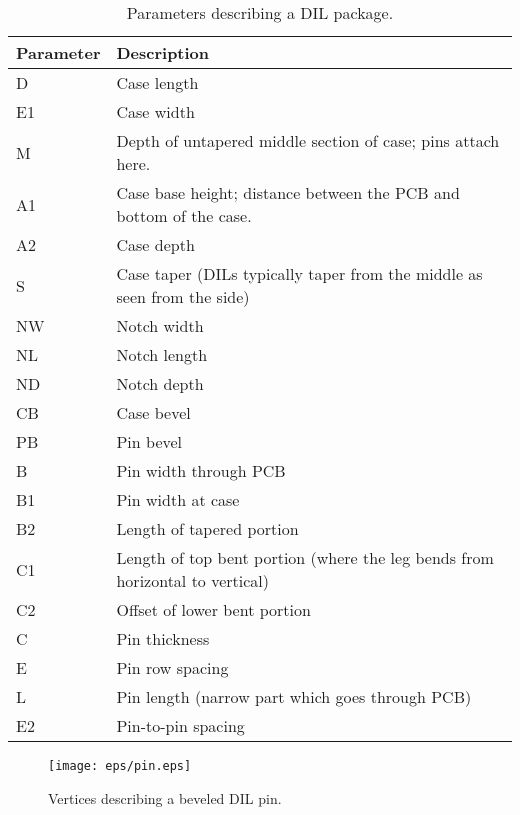 \documentclass[a4paper, dvipdfm]{article}
\begin{document}
\begin{table}
\caption{Parameters describing a DIL package.}
\label{tab:dilparams}
\begin{tabular}{|l|l|}
\hline
\textbf{Parameter} & \textbf{Description}\\
\hline
D & Case length\\
E1 & Case width\\
M & Depth of untapered middle section of case; pins attach here.\\
A1 & Case base height; distance between the PCB and bottom of the case.\\
A2 & Case depth\\
S & Case taper (DILs typically taper from the middle as seen from the side)\\
NW & Notch width\\
NL & Notch length\\
ND & Notch depth\\
CB & Case bevel\\
\hline
\hline
PB & Pin bevel\\
B & Pin width through PCB\\
B1 & Pin width at case\\
B2 & Length of tapered portion\\
C1 & Length of top bent portion (where the leg bends from horizontal to vertical)\\
C2 & Offset of lower bent portion\\
C  & Pin thickness\\
E  & Pin row spacing\\
L  & Pin length (narrow part which goes through PCB)\\
E2 & Pin-to-pin spacing\\
\hline
\end{tabular}
\end{table}

\begin{figure}
\begin{center}
\texttt{[image: eps/pin.eps]}
\end{center}
\caption{Vertices describing a beveled DIL pin.}
\label{fig:dilpin}
\end{figure}
\end{document}
